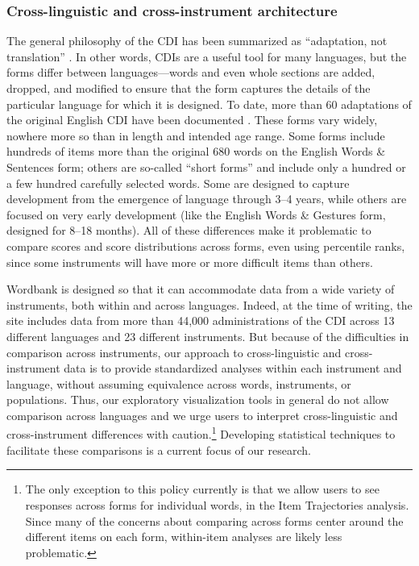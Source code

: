 \documentclass[man,noapacite]{apa}
\begin{document}
\subsubsection{Cross-linguistic and cross-instrument architecture}

The general philosophy of the CDI has been summarized as ``adaptation, not translation'' \cite{dale2015}. In other words, CDIs are a useful tool for many languages, but the forms differ between languages---words and even whole sections are added, dropped, and modified to ensure that the form captures the details of the particular language for which it is designed. To date, more than 60 adaptations of the original English CDI have been documented \cite{dale2011}. These forms vary widely, nowhere more so than in length and intended age range. Some forms include hundreds of items more than the original 680 words on the English Words \& Sentences form; others are so-called ``short forms'' and include only a hundred or a few hundred carefully selected words. Some are designed to capture development from the emergence of language through 3--4 years, while others are focused on very early development (like the English Words \& Gestures form, designed for 8--18 months). All of these differences make it problematic to compare scores and score distributions across forms, even using percentile ranks, since some instruments will have more or more difficult items than others. 

Wordbank is designed so that it can accommodate data from a wide variety of instruments, both within and across languages. Indeed, at the time of writing, the site includes data from more than 44,000 administrations of the CDI across 13 different languages and 23 different instruments. But because of the difficulties in comparison across instruments, our approach to cross-linguistic and cross-instrument data is to provide standardized analyses within each instrument and language, without assuming equivalence across words, instruments, or populations. Thus, our exploratory visualization tools in general do not allow comparison across languages and we urge users to interpret cross-linguistic and cross-instrument differences with caution.\footnote{The only exception to this policy currently is that we allow users to see responses across forms for individual words, in the Item Trajectories analysis. Since many of the concerns about comparing across forms center around the different items on each form, within-item analyses are likely less problematic.} Developing statistical techniques to facilitate these comparisons is a current focus of our research. 
\end{document}
